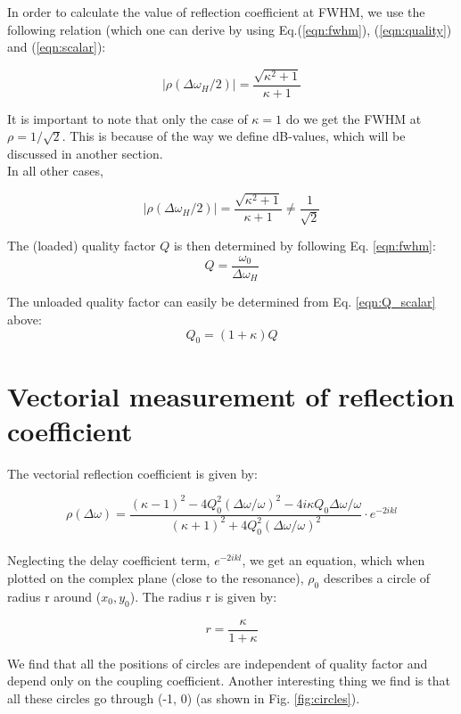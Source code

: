 \documentclass[a4paper]{report}
\numberwithin{equation}{section}
\begin{document}
In order to calculate the value of reflection coefficient at FWHM, we use the following relation (which one can derive by using Eq.(\ref{eqn:fwhm}), (\ref{eqn:quality}) and (\ref{eqn:scalar}):

\begin{equation}
		\left| \rho (\Delta \omega_{H}/2) \right| = \frac{\sqrt{\kappa^2 + 1} }{\kappa +1} 
		\label{eqn:rho_fwhm}
\end{equation}

It is important to note that only the case of $\kappa = 1$ do we get the FWHM at $\rho = 1 / \sqrt{2} $. This is because of the way we define dB-values, which will be discussed in another section. \\
In all other cases, 

\[
		\left| \rho (\Delta \omega_{H}/2) \right| = \frac{\sqrt{\kappa^2 + 1} }{\kappa +1} \ne \frac{1}{\sqrt{2} } 
\]

The (loaded) quality factor $Q$ is then determined by following Eq.
\ref{eqn:fwhm}:
\begin{equation}
	Q = \frac{\omega_0}{\Delta\omega_H}
	\label{eqn:Q_scalar}
\end{equation}

The unloaded quality factor can easily be determined from Eq. \ref{eqn:Q_scalar}
above:
\begin{equation}
	Q_0 = (1 + \kappa)Q
	\label{eqn:Q0_scalar}
\end{equation}

\section{Vectorial measurement of reflection coefficient}
The vectorial reflection coefficient is given by: 

\begin{equation}
		\rho (\Delta \omega) = \frac{(\kappa - 1)^2 - 4Q_{0}^2 \left(\Delta \omega / \omega \right)^2 - 4i \kappa Q_{0} \Delta\omega / \omega}{(\kappa + 1)^2 + 4Q_{0}^2 \left(\Delta \omega / \omega \right)^2}  \cdot e^{-2ikl}
\end{equation}
\\
Neglecting the delay coefficient term, $e^{-2ikl}$, we get an equation, which when plotted on the complex plane (close to the resonance), $\rho_{0}$ describes a circle of radius r around ($x_{0}, y_{0}$).  The radius r is given by: 

\[
		r = \frac{\kappa}{1+ \kappa}
\]

We find that all the positions of circles are independent of quality factor and depend only on the coupling coefficient. Another interesting thing we find is that all these circles go through (-1, 0) (as shown in Fig. \ref{fig:circles}). 
\end{document}
